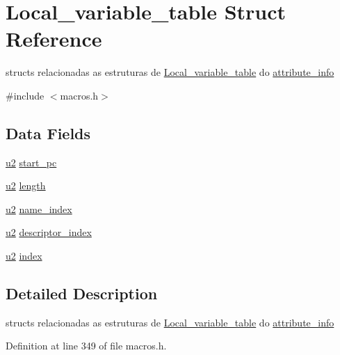 \hypertarget{struct_local__variable__table}{}\section{Local\+\_\+variable\+\_\+table Struct Reference}
\label{struct_local__variable__table}


structs relacionadas as estruturas de \hyperlink{struct_local__variable__table}{Local\+\_\+variable\+\_\+table} do \hyperlink{structattribute__info}{attribute\+\_\+info}  




{\ttfamily \#include $<$macros.\+h$>$}

\subsection*{Data Fields}
\begin{DoxyCompactItemize}
\item 
\hyperlink{macros_8h_aa76d8c8015643c6a837661a10142016e}{u2} \hyperlink{struct_local__variable__table_a3ded0b47a89e0816c20dc577a82a1cd5}{start\+\_\+pc}
\item 
\hyperlink{macros_8h_aa76d8c8015643c6a837661a10142016e}{u2} \hyperlink{struct_local__variable__table_ad01efb9db3818b64eae5965bf341710f}{length}
\item 
\hyperlink{macros_8h_aa76d8c8015643c6a837661a10142016e}{u2} \hyperlink{struct_local__variable__table_ae939ac3ca00f5727beaa02d0e339183d}{name\+\_\+index}
\item 
\hyperlink{macros_8h_aa76d8c8015643c6a837661a10142016e}{u2} \hyperlink{struct_local__variable__table_a3f13794b6c8b4ffc87b87a7c01a69060}{descriptor\+\_\+index}
\item 
\hyperlink{macros_8h_aa76d8c8015643c6a837661a10142016e}{u2} \hyperlink{struct_local__variable__table_a125cab34bc0dc872fa4a0aedbe688365}{index}
\end{DoxyCompactItemize}


\subsection{Detailed Description}
structs relacionadas as estruturas de \hyperlink{struct_local__variable__table}{Local\+\_\+variable\+\_\+table} do \hyperlink{structattribute__info}{attribute\+\_\+info} 

Definition at line 349 of file macros.\+h.



